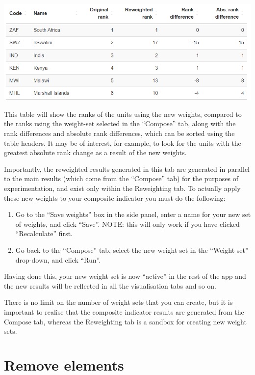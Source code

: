 \documentclass[
  letterpaper,
  DIV=11,
  numbers=noendperiod]{scrreprt}
\providecommand{\tightlist}{%
  \setlength{\itemsep}{0pt}\setlength{\parskip}{0pt}}\usepackage{longtable,booktabs,array}
\begin{document}
\includegraphics[width=1\textwidth,height=\textheight]{figs/reweighting_3.png}

This table will show the ranks of the units using the new weights,
compared to the ranks using the weight-set selected in the ``Compose''
tab, along with the rank differences and absolute rank differences,
which can be sorted using the table headers. It may be of interest, for
example, to look for the units with the greatest absolute rank change as
a result of the new weights.

Importantly, the reweighted results generated in this tab are generated
in parallel to the main results (which come from the ``Compose'' tab)
for the purposes of experimentation, and exist only within the
Reweighting tab. To actually apply these new weights to your composite
indicator you must do the following:

\begin{enumerate}
\def\labelenumi{\arabic{enumi}.}
\tightlist
\item
  Go to the ``Save weights'' box in the side panel, enter a name for
  your new set of weights, and click ``Save''. NOTE: this will only work
  if you have clicked ``Recalculate'' first.
\item
  Go back to the ``Compose'' tab, select the new weight set in the
  ``Weight set'' drop-down, and click ``Run''.
\end{enumerate}

Having done this, your new weight set is now ``active'' in the rest of
the app and the new results will be reflected in all the visualisation
tabs and so on.

There is no limit on the number of weight sets that you can create, but
it is important to realise that the composite indicator results are
generated from the Compose tab, whereas the Reweighting tab is a sandbox
for creating new weight sets.

\hypertarget{sec-remove_elements}{%
\chapter{Remove elements}\label{sec-remove_elements}}
\end{document}
